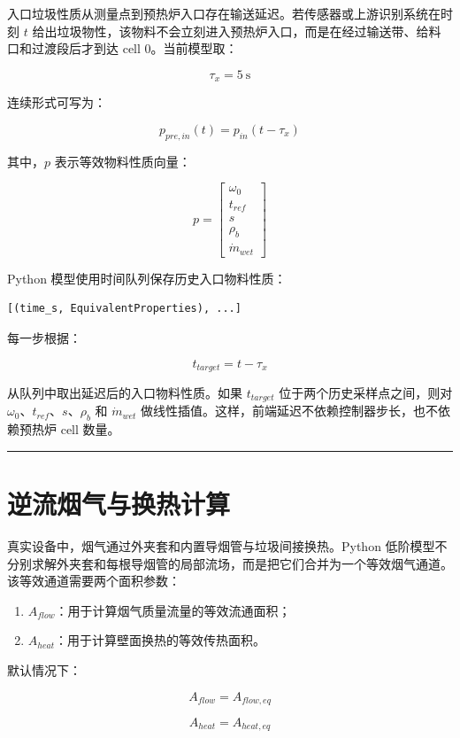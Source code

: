 \documentclass[UTF8,openany,zihao=-4,oneside]{ctexbook}
\newcommand{\manualdivider}{\par\vspace{0.6em}\noindent\textcolor{FGLine}{\rule{\linewidth}{0.7pt}}\vspace{0.6em}\par}
\begin{document}
入口垃圾性质从测量点到预热炉入口存在输送延迟。若传感器或上游识别系统在时刻 \(t\) 给出垃圾物性，该物料不会立刻进入预热炉入口，而是在经过输送带、给料口和过渡段后才到达 cell 0。当前模型取：

\[
\tau_x=5\ \mathrm{s}
\]

连续形式可写为：

\[
p_{pre,in}(t)=p_{in}(t-\tau_x)
\]

其中，\(p\) 表示等效物料性质向量：

\[
p=
\begin{bmatrix}
\omega_0\\
t_{ref}\\
s\\
\rho_b\\
\dot m_{wet}
\end{bmatrix}
\]

Python 模型使用时间队列保存历史入口物料性质：

\begin{lstlisting}
[(time_s, EquivalentProperties), ...]
\end{lstlisting}

每一步根据：

\[
t_{target}=t-\tau_x
\]

从队列中取出延迟后的入口物料性质。如果 \(t_{target}\) 位于两个历史采样点之间，则对 \(\omega_0\)、\(t_{ref}\)、\(s\)、\(\rho_b\) 和 \(\dot m_{wet}\) 做线性插值。这样，前端延迟不依赖控制器步长，也不依赖预热炉 cell 数量。

\manualdivider

\section{逆流烟气与换热计算}\label{ux9006ux6d41ux70dfux6c14ux4e0eux6362ux70edux8ba1ux7b97}

真实设备中，烟气通过外夹套和内置导烟管与垃圾间接换热。Python 低阶模型不分别求解外夹套和每根导烟管的局部流场，而是把它们合并为一个等效烟气通道。该等效通道需要两个面积参数：

\begin{enumerate}
\item \(A_{flow}\)：用于计算烟气质量流量的等效流通面积；
\item \(A_{heat}\)：用于计算壁面换热的等效传热面积。
\end{enumerate}

默认情况下：

\[
A_{flow}=A_{flow,eq}
\]

\[
A_{heat}=A_{heat,eq}
\]
\end{document}
